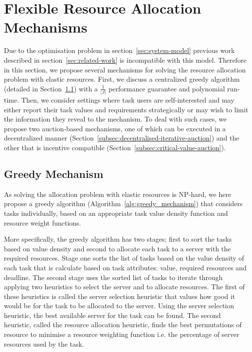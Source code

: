 \section{Flexible Resource Allocation Mechanisms}\label{sec:flexible-resource-allocation-mechanisms}
Due to the optimisation problem in section~\ref{sec:system-model} previous work described in
section~\ref{sec:related-work} is incompatible with this model. Therefore in this section, we propose several
mechanisms for solving the resource allocation problem with elastic resources. First, we discuss a centralized greedy
algorithm (detailed in Section~\ref{subsec:greedy-mechanism}) with a $\frac{1}{\left|J\right|}$ performance guarantee
and polynomial run-time. Then, we consider settings where task users are self-interested and may either report their
task values and requirements strategically or may wish to limit the information they reveal to the mechanism. To deal
with such cases, we propose two auction-based mechanisms, one of which can be executed in a decentralized manner
(Section~\ref{subsec:decentralised-iterative-auction}) and the other that is incentive compatible
(Section~\ref{subsec:critical-value-auction}).

\subsection{Greedy Mechanism}\label{subsec:greedy-mechanism}
As solving the allocation problem with elastic resources is NP-hard, we here propose a greedy algorithm
(Algorithm~\ref{alg:greedy_mechanism}) that considers tasks individually, based on an appropriate task value density
function and resource weight functions.

More specifically, the greedy algorithm has two stages; first to sort the tasks based on value density and second to
allocate each task to a server with the required resources. Stage one sorts the list of tasks based on the value
density of each task that is calculate based on task attributes: value, required resources and deadline. The second
stage uses the sorted list of tasks to iterate through applying two heuristics to select the server and to allocate
resources. The first of these heuristics is called the server selection heuristic that values how good it would be
for the task to be allocated to the server. Using the server selection heuristic, the best available server for the
task can be found. The second heuristic, called the resource allocation heuristic, finds the best permutations of
resource to minimise a resource weighting function i.e. the percentage of server resources used by the task.

